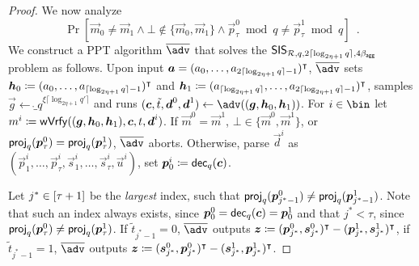 \begin{proof}
  We now analyze 
  \[
    \Pr[\vec{m}_0\neq \vec{m}_1 \land \bot\not\in\{\vec{m}_0,\vec{m}_1\} \land \vec{p}_\tau^0 \bmod q \neq \vec{p}_\tau^1 \bmod q]\enspace.
  \]
  We construct a PPT algorithm $\sisadv$ that solves the $\mathsf{SIS}_{\mathcal{R},q,2\lceil\log_{2\eta+1} q\rceil,4\beta_{\mathsf{agg}}}$ problem as follows.
  Upon input $\boldsymbol{a}=(a_0,\dots,a_{2\lceil\log_{2\eta+1} q\rceil-1})^\intercal$,
  $\sisadv$ sets 
  $\boldsymbol{h}_0\coloneqq(a_0,\dots,a_{\lceil\log_{2\eta+1} q\rceil-1})^\intercal$ and 
  $\boldsymbol{h}_1 \coloneqq (a_{\lceil\log_{2\eta+1} q\rceil},\dots,a_{2\lceil\log_{2\eta+1} q\rceil-1})^\intercal$,
  samples $\vec{g} \gets \ring_q^{\xi\lceil\log_{2\eta+1} q'\rceil}$ and runs 
  $(\vec{c},\tilde t,\vec{d}^0,\vec{d}^1) \gets \adv((\vec{g},\vec{h}_0,\vec{h}_1))$.
  For $i\in\bin$ let $m^i \coloneqq \mathsf{wVrfy}((\boldsymbol{g},\boldsymbol{h}_0,\boldsymbol{h}_1),\boldsymbol{c},t,\boldsymbol{d}^i)$.
  If $\vec{m}^0 = \vec{m}^1$, $\bot\in\{\vec{m}^0,\vec{m}^1\}$, or $\mathsf{proj}_{q}(\boldsymbol{p}_\tau^0) = \mathsf{proj}_{q}(\boldsymbol{p}_\tau^1)$, $\sisadv$ aborts.
  Otherwise, parse $\vec{d}^i$ as $(\vec{p}^i_1,\dots,\vec{p}^i_{\tau},\vec{s}^i_1,\dots,\vec{s}^i_\tau,\vec{u}^i)$, set $\boldsymbol{p}^i_0 \coloneqq \mathsf{dec}_{q}(\boldsymbol{c})$.
  
  Let $j^*\in [\tau+1]$ be the \emph{largest} index, such that $\mathsf{proj}_{q}(\boldsymbol{p}^0_{j^*-1})\neq\mathsf{proj}_{q}(\boldsymbol{p}^1_{j^*-1})$.
  Note that such an index always exists, since $\boldsymbol{p}^0_0 = \mathsf{dec}_{q}(\boldsymbol{c}) = \boldsymbol{p}^1_0$ and that $j^* < \tau$, since $\mathsf{proj}_{q}(\boldsymbol{p}_\tau^0) \neq \mathsf{proj}_{q}(\boldsymbol{p}_\tau^1)$.
  If $\tilde t_{j^*-1} = 0$, $\sisadv$ outputs $
  \boldsymbol{z}\coloneqq(\boldsymbol{p}_{j^*}^0, \boldsymbol{s}_{j^*}^0)^\intercal - (\boldsymbol{p}_{j^*}^1, \boldsymbol{s}_{j^*}^1)^\intercal$, if $\tilde t_{j^*-1} = 1$, $\sisadv$ outputs $\boldsymbol{z}\coloneqq(\boldsymbol{s}_{j^*}^0, \boldsymbol{p}_{j^*}^0)^\intercal - (\boldsymbol{s}_{j^*}^1, \boldsymbol{p}_{j^*}^1)^\intercal$.
  

\end{proof}
